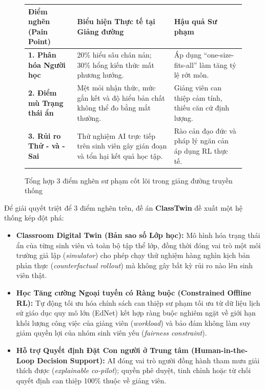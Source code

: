 \begin{figure}[htbp]
  \centering
  \begin{tcolorbox}[colback=white, colframe=NavyBlue, boxrule=0.8pt, arc=3pt, width=0.98\textwidth]
    \small
    \begin{tabularx}{\textwidth}{p{3.5cm} X p{4cm}}
      \toprule
      \textbf{Điểm nghẽn (Pain Point)} & \textbf{Biểu hiện Thực tế tại Giảng đường} & \textbf{Hậu quả Sư phạm} \\
      \midrule
      \textbf{1. Phân hóa Người học} & 20\% hiểu sâu chán nản; 30\% hổng kiến thức mất phương hướng. & Áp dụng ``one-size-fits-all'' làm tăng tỷ lệ rớt môn. \\
      \addlinespace
      \textbf{2. Điểm mù Trạng thái ẩn} & Mệt mỏi nhận thức, mức gắn kết và độ hiểu bản chất không thể đo bằng mắt thường. & Giảng viên can thiệp cảm tính, thiếu căn cứ định lượng. \\
      \addlinespace
      \textbf{3. Rủi ro Thử - và - Sai} & Thử nghiệm AI trực tiếp trên sinh viên gây gián đoạn và tổn hại kết quả học tập. & Rào cản đạo đức và pháp lý ngăn cản áp dụng RL thực tế. \\
      \bottomrule
    \end{tabularx}
  \end{tcolorbox}
  \caption{Tổng hợp 3 điểm nghẽn sư phạm cốt lõi trong giảng đường truyền thống}\label{fig:pain-points-summary}
\end{figure}

\begin{highlightbox}
Để giải quyết triệt để 3 điểm nghẽn trên, đề án \textbf{ClassTwin} đề xuất một hệ thống kép đột phá:
\begin{itemize}
  \item \textbf{Classroom Digital Twin (Bản sao số Lớp học):} Mô hình hóa trạng thái ẩn của từng sinh viên và toàn bộ tập thể lớp, đồng thời đóng vai trò một môi trường giả lập (\textit{simulator}) cho phép chạy thử nghiệm hàng nghìn kịch bản phản thực (\textit{counterfactual rollout}) mà không gây bất kỳ rủi ro nào lên sinh viên thật.
  \item \textbf{Học Tăng cường Ngoại tuyến có Ràng buộc (Constrained Offline RL):} Tự động tối ưu hóa chính sách can thiệp sư phạm tối ưu từ dữ liệu lịch sử giáo dục quy mô lớn (EdNet) kết hợp ràng buộc nghiêm ngặt về giới hạn khối lượng công việc của giảng viên (\textit{workload}) và bảo đảm không làm suy giảm quyền lợi của nhóm sinh viên yếu (\textit{fairness constraint}).
  \item \textbf{Hỗ trợ Quyết định Đặt Con người ở Trung tâm (Human-in-the-Loop Decision Support):} AI đóng vai trò người đồng hành tham mưu giải thích được (\textit{explainable co-pilot}); quyền phê duyệt, tinh chỉnh hoặc từ chối quyết định can thiệp 100\% thuộc về giảng viên.
\end{itemize}
\end{highlightbox}

